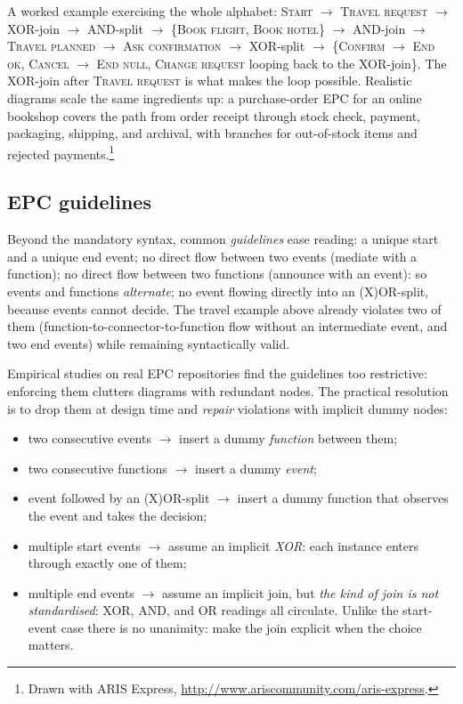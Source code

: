 A worked example exercising the whole alphabet: \textsc{Start} $\to$ \textsc{Travel request} $\to$ XOR-join $\to$ AND-split $\to$ \{\textsc{Book flight}, \textsc{Book hotel}\} $\to$ AND-join $\to$ \textsc{Travel planned} $\to$ \textsc{Ask confirmation} $\to$ XOR-split $\to$ \{\textsc{Confirm} $\to$ \textsc{End ok}, \textsc{Cancel} $\to$ \textsc{End null}, \textsc{Change request} looping back to the XOR-join\}. The XOR-join after \textsc{Travel request} is what makes the loop possible. Realistic diagrams scale the same ingredients up: a purchase-order EPC for an online bookshop covers the path from order receipt through stock check, payment, packaging, shipping, and archival, with branches for out-of-stock items and rejected payments.\footnote{Drawn with ARIS Express, \url{http://www.ariscommunity.com/aris-express}.}

\subsection{EPC guidelines}

Beyond the mandatory syntax, common \emph{guidelines} ease reading: a unique start and a unique end event; no direct flow between two events (mediate with a function); no direct flow between two functions (announce with an event): so events and functions \emph{alternate}; no event flowing directly into an (X)OR-split, because events cannot decide. The travel example above already violates two of them (function-to-connector-to-function flow without an intermediate event, and two end events) while remaining syntactically valid.

Empirical studies on real EPC repositories find the guidelines too restrictive: enforcing them clutters diagrams with redundant nodes. The practical resolution is to drop them at design time and \emph{repair} violations with implicit dummy nodes:
\begin{itemize}
  \item two consecutive events $\to$ insert a dummy \emph{function} between them;
  \item two consecutive functions $\to$ insert a dummy \emph{event};
  \item event followed by an (X)OR-split $\to$ insert a dummy function that observes the event and takes the decision;
  \item multiple start events $\to$ assume an implicit \emph{XOR}: each instance enters through exactly one of them;
  \item multiple end events $\to$ assume an implicit join, but \emph{the kind of join is not standardised}: XOR, AND, and OR readings all circulate. Unlike the start-event case there is no unanimity: make the join explicit when the choice matters.
\end{itemize}

